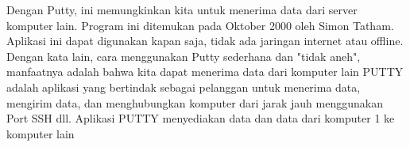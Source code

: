 Dengan Putty, ini memungkinkan kita untuk menerima data dari server komputer lain. Program ini ditemukan pada Oktober 2000 oleh Simon Tatham. Aplikasi ini dapat digunakan kapan saja, tidak ada jaringan internet atau offline. Dengan kata lain, cara menggunakan Putty sederhana dan "tidak aneh", manfaatnya adalah bahwa kita dapat menerima data dari komputer lain PUTTY adalah aplikasi yang bertindak sebagai pelanggan untuk menerima data, mengirim data, dan menghubungkan komputer dari jarak jauh menggunakan Port SSH dll. Aplikasi PUTTY menyediakan data dan data dari komputer 1 ke komputer lain